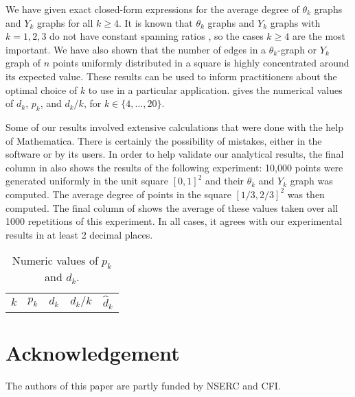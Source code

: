 \documentclass{patmorin}
\begin{document}
We have given exact closed-form expressions for the average degree of
$\theta_k$ graphs and $Y_k$ graphs for all $k\ge 4$.  It is known that
$\theta_k$ graphs and $Y_k$ graphs with $k=1,2,3$ do not have constant
spanning ratios \cite{S}, so the cases $k\ge 4$ are the most important.
We have also shown that the number of edges in a $\theta_k$-graph or
$Y_k$ graph of $n$ points uniformly distributed in a square is highly
concentrated around its expected value.  These results can be used
to inform practitioners about the optimal choice of $k$ to use in a
particular application.   gives the numerical values of
$d_k$, $p_k$, and $d_k/k$, for $k\in\{4,\ldots,20\}$.

Some of our results involved extensive calculations that were done
with the help of Mathematica.  There is certainly the possibility of
mistakes, either in the software or by its users.  In order to help
validate our analytical results, the final column in 
also shows the results of the following experiment: 10,000 points were
generated uniformly in the unit square $[0,1]^2$ and their $\theta_k$
and $Y_k$ graph was computed.  The average degree of points in the square
$[1/3,2/3]^2$ was then computed.  The final column of 
shows the average of these values taken over all 1000 repetitions of
this experiment.  In all cases, it agrees with our experimental results
in at least 2 decimal places.

\begin{table}
   \begin{center}
     \begin{tabular}{ccccc}
       $k$ & $p_k$ & $d_k$ & $d_k/k$ & $\hat{d}_k$ \\
     \end{tabular}
   \end{center}
   \caption{Numeric values of $p_k$ and $d_k$.}
\end{table}

\section*{Acknowledgement}

The authors of this paper are partly funded by NSERC and CFI.



\end{document}
